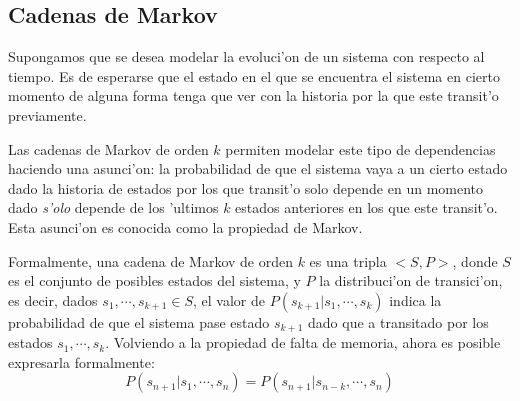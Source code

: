 %
%
%
%
%

\subsection{Cadenas de Markov}
Supongamos que se desea modelar la evoluci'on de un sistema con respecto al tiempo. Es de esperarse que 
el estado en el que se encuentra el sistema en cierto momento de alguna forma tenga que ver con la historia por la que este transit'o
previamente. 

Las cadenas de Markov de orden $k$ permiten modelar este tipo de dependencias haciendo una asunci'on: la probabilidad de que el sistema vaya a un cierto estado
dado la historia de estados por los que transit'o solo depende en un momento dado \emph{s'olo} depende de los 'ultimos $k$ estados anteriores en los que este transit'o. 
Esta asunci'on es conocida como la propiedad de Markov. 

Formalmente, una cadena de Markov de orden $k$ es una tripla $<S,P>$, donde $S$ es el conjunto de posibles estados del sistema, y $P$ la 
distribuci'on de transici'on, es decir, dados $s_1, \cdots, s_{k+1} \in S$, el valor de $P(s_{k+1} | s_1, \cdots, s_k)$ indica la probabilidad
de que el sistema pase estado $s_{k+1}$ dado que a transitado por los estados $s_1, \cdots, s_k$. 
Volviendo a la propiedad de falta de memoria, ahora es posible expresarla formalmente: $$P(s_{n+1}|s_1,\cdots,s_n) = P(s_{n+1} | s_{n-k}, \cdots, s_n)$$

